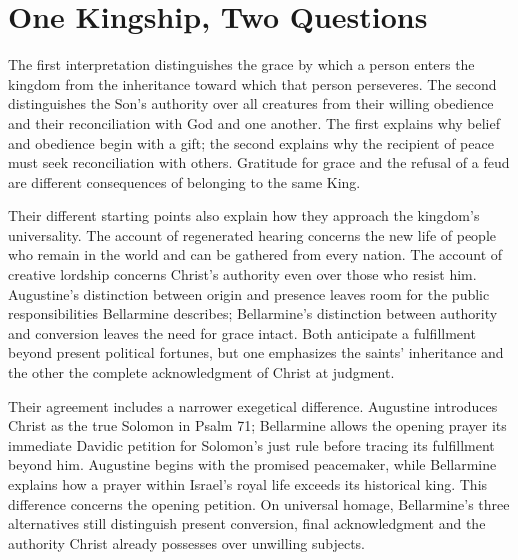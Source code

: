 \section{One Kingship, Two Questions}
The first interpretation distinguishes the grace by which a person enters the kingdom from the inheritance toward which that person perseveres. The second distinguishes the Son's authority over all creatures from their willing obedience and their reconciliation with God and one another. The first explains why belief and obedience begin with a gift; the second explains why the recipient of peace must seek reconciliation with others. Gratitude for grace and the refusal of a feud are different consequences of belonging to the same King.

Their different starting points also explain how they approach the kingdom's universality. The account of regenerated hearing concerns the new life of people who remain in the world and can be gathered from every nation. The account of creative lordship concerns Christ's authority even over those who resist him. Augustine's distinction between origin and presence leaves room for the public responsibilities Bellarmine describes; Bellarmine's distinction between authority and conversion leaves the need for grace intact. Both anticipate a fulfillment beyond present political fortunes, but one emphasizes the saints' inheritance and the other the complete acknowledgment of Christ at judgment.

Their agreement includes a narrower exegetical difference. Augustine introduces Christ as the true Solomon in Psalm 71; Bellarmine allows the opening prayer its immediate Davidic petition for Solomon's just rule before tracing its fulfillment beyond him. Augustine begins with the promised peacemaker, while Bellarmine explains how a prayer within Israel's royal life exceeds its historical king. This difference concerns the opening petition. On universal homage, Bellarmine's three alternatives still distinguish present conversion, final acknowledgment and the authority Christ already possesses over unwilling subjects.
